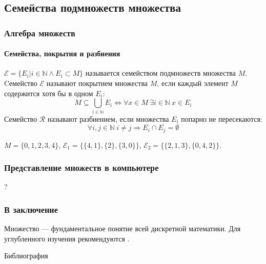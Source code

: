 \subsection{Семейства подмножеств множества}

\begin{frame}
    \frametitle{Алгебра множеств}
    \framesubtitle{Семейства, покрытия и разбиения}

    $\mathcal{E}=\{E_i|i\in\mathbb{N}\land E_i\subset M\}$ называется \alert{семейством} подмножеств множества $M$. Cемейство $\mathcal{E}$ называют \alert{покрытием} множества $M$, если каждый элемент $M$ содержится хотя бы в одном $E_i$:
    \[
        M\subseteq\bigcup_{i\in\mathbb{N}}E_i
        \Leftrightarrow
        \forall x\in M~\exists i\in\mathbb{N}~x\in E_i
    \]
    Семейство $\mathcal{R}$ называют \alert{разбиением}, если множества $E_i$ попарно не пересекаются:
    \[
        \forall i,j\in\mathbb{N}~i\neq j\Rightarrow E_i\cap E_j=\emptyset
    \]
    \begin{example}
        $M=\{0,1,2,3,4\}$, 
        $\mathcal{E}_1=\{\{4,1\},\{2\},\{3,0\}\}$,
        $\mathcal{E}_2=\{\{2,1,3\},\{0,4,2\}\}$.
    \end{example}
\end{frame}


\appendix

\begin{frame}
    \frametitle{Представление множеств в компьютере}
    
    \begin{center}
        ?
    \end{center}
\end{frame}


\begin{frame}
    \frametitle{В заключение}
    
    Множество --- фундаментальное понятие всей дискретной математики. Для углубленного изучения рекомендуются \cite{bib:sudoplatov:discrmath, bib:haggard:discrmathprogrammer, bib:novic:discrmathprogrammer}.
\end{frame}


\begin{frame}[allowframebreaks]{Библиография}
    
    
\end{frame}

